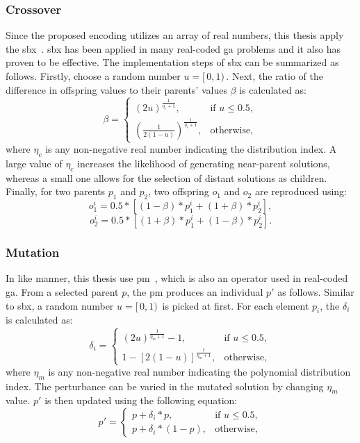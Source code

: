 \subsubsection{Crossover}
Since the proposed encoding utilizes an array of real numbers, this thesis apply the \gls{sbx}~\cite{deb1995simulated}. \gls{sbx} has been applied in many real-coded \gls{ga} problems and it also has proven to be effective. The implementation steps of \gls{sbx} can be summarized as follows. Firstly, choose a random number $u = [ \, 0, 1) \,$. Next, the ratio of the difference in offspring values to their parents' values $\beta$ is calculated as:
\begin{equation}
	\beta = 
	\begin{cases}
		(2u)^{\frac{1}{\eta_c + 1}}, & \text{if $u \leq 0.5$},\\
		(\frac{1}{2(1 - u)})^{\frac{1}{\eta_c + 1}}, & \text{otherwise},
	\end{cases}  
\end{equation}
where $\eta_c$ is any non-negative real number indicating the distribution index. A large value of $\eta_c$ increases the likelihood of generating near-parent solutions, whereas a small one allows for the selection of distant solutions as children. Finally, for two parents $p_1$ and $p_2$, two offspring $o_1$ and $o_2$ are reproduced using:
\begin{equation}
	o^i_1 = 0.5*[(1-\beta)*p^i_1 + (1+\beta)*p^i_2],
\end{equation}
\begin{equation}
	o^i_2 = 0.5*[(1+\beta)*p^i_1 + (1-\beta)*p^i_2].
\end{equation}

\subsubsection{Mutation}
In like manner, this thesis use \gls{pm}~\cite{deb2014analysing}, which is also an operator used in real-coded \gls{ga}. From a selected parent $p$, the \gls{pm} produces an individual $p'$ as follows. Similar to \gls{sbx}, a random number $u = 	[ \, 0, 1) \,$ is picked at first. For each element $p_i$, the $\delta_i$ is calculated as:
\begin{equation}
	\delta_i = 
	\begin{cases}
		(2u)^{\frac{1}{\eta_m + 1}} - 1, & \text{if $u \leq 0.5$},\\
		1 - [2(1-u)]^{\frac{1}{\eta_m + 1}}, & \text{otherwise},
	\end{cases}
\end{equation}
where $\eta_m$ is any non-negative real number indicating the polynomial distribution index. The perturbance can be varied in the mutated solution by changing $\eta_m$ value. $p'$ is then updated using the following equation:
\begin{equation}
	p' = 
	\begin{cases}
		p + \delta_i * p, & \text{if $u \leq 0.5$},\\
		p + \delta_i * (1-p), & \text{otherwise},
	\end{cases}
\end{equation}